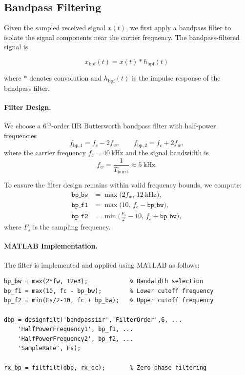 \documentclass[10pt]{article}
\begin{document}
\subsection*{Bandpass Filtering}

Given the sampled received signal $x(t)$, we first apply a bandpass filter to isolate the signal components near the carrier frequency. The bandpass-filtered signal is

\begin{equation}
x_{\mathrm{bpf}}(t) = x(t) * h_{\mathrm{bpf}}(t)
\end{equation}

where $*$ denotes convolution and $h_{\mathrm{bpf}}(t)$ is the impulse response of the bandpass filter.  

\paragraph{Filter Design.}
We choose a $6^{\text{th}}$-order IIR Butterworth bandpass filter with half-power frequencies
\[
f_{\mathrm{bp},1} = f_c - 2f_w, \qquad
f_{\mathrm{bp},2} = f_c + 2f_w,
\]
where the carrier frequency $f_c = 40~\mathrm{kHz}$ and the signal bandwidth is
\[
f_w = \frac{1}{T_{\mathrm{burst}}} \approx 5~\mathrm{kHz}.
\]

To ensure the filter design remains within valid frequency bounds, we compute:
\[
\begin{aligned}
\texttt{bp\_bw} &= \max\!\bigl(2f_w,\, 12~\mathrm{kHz}\bigr),\\[4pt]
\texttt{bp\_f1} &= \max\!\bigl(10,\, f_c - \texttt{bp\_bw}\bigr),\\[4pt]
\texttt{bp\_f2} &= \min\!\bigl(\tfrac{F_s}{2}-10,\, f_c + \texttt{bp\_bw}\bigr),
\end{aligned}
\]
where $F_s$ is the sampling frequency.

\paragraph{MATLAB Implementation.}
The filter is implemented and applied using MATLAB as follows:

\begin{lstlisting}
bp_bw = max(2*fw, 12e3);            % Bandwidth selection
bp_f1 = max(10, fc - bp_bw);        % Lower cutoff frequency
bp_f2 = min(Fs/2-10, fc + bp_bw);   % Upper cutoff frequency

dbp = designfilt('bandpassiir','FilterOrder',6, ...
    'HalfPowerFrequency1', bp_f1, ...
    'HalfPowerFrequency2', bp_f2, ...
    'SampleRate', Fs);

rx_bp = filtfilt(dbp, rx_dc);       % Zero-phase filtering
\end{lstlisting}
\end{document}
